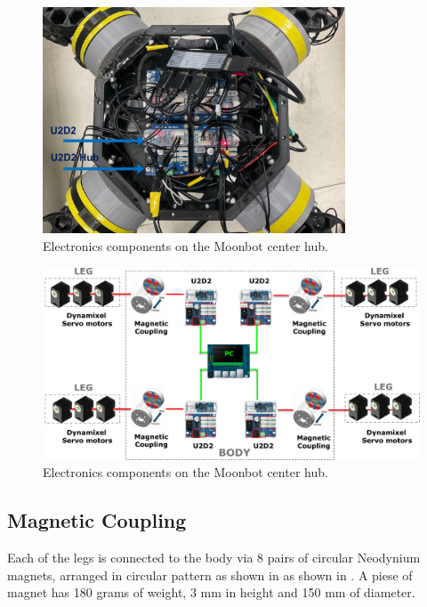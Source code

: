 \begin{figure}[t]
  \centering
  \includegraphics[width=90mm]{./fig/chap2/bodyelectronics.pdf}
  \vspace{2mm}
  \caption{Electronics components on the Moonbot center hub.}\label{electronics}
\end{figure}

\begin{figure}[t]
  \centering
  \includegraphics[width=140mm]{./fig/chap2/electronics_diagram.pdf}
  \vspace{2mm}
  \caption{Electronics components on the Moonbot center hub.}\label{electronics_diagram}
\end{figure}

\subsection{Magnetic Coupling}
Each of the legs is connected to the body via 8 pairs of circular Neodynium magnets, arranged in circular pattern as shown in as shown in . A piese of magnet has 180 grams of weight, 3 mm in height and 150 mm of diameter.

